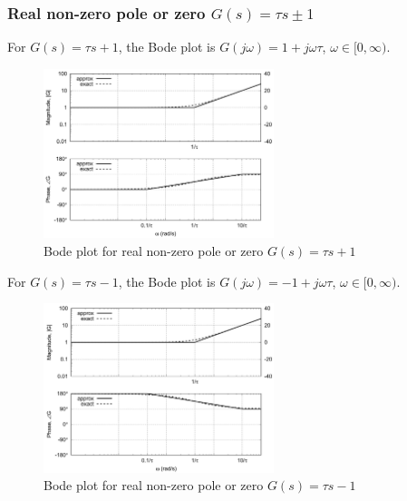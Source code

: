 \documentclass[letterpaper,12pt]{article}
\begin{document}
\subsubsection{Real non-zero pole or zero $G(s) = \tau s \pm 1$}
For $G(s) = \tau s + 1$, the Bode plot is $G(j \omega) = 1 + j\omega \tau$, $\omega \in [0, \infty)$.
\begin{figure}[h]
    \centering
    \includegraphics[width=0.6\textwidth]{case4 real nonzero root negative.png}
    \caption{Bode plot for real non-zero pole or zero $G(s) = \tau s + 1$}
\end{figure}

For $G(s) = \tau s - 1$, the Bode plot is $G(j \omega) = -1 + j\omega \tau$, $\omega \in [0, \infty)$.
\begin{figure}[h]
    \centering
    \includegraphics[width=0.6\textwidth]{case5 real nonzero root positive.png}
    \caption{Bode plot for real non-zero pole or zero $G(s) = \tau s - 1$}
\end{figure}
\FloatBarrier
\end{document}
